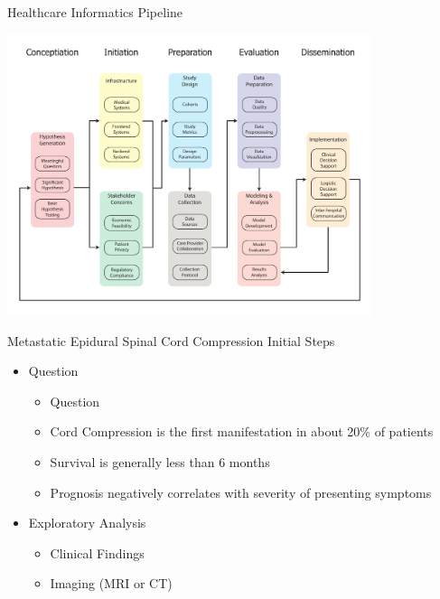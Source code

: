 \documentclass[10pt]{beamer}
\begin{document}




\begin{frame}{Healthcare Informatics Pipeline}
	\begin{center}
		\includegraphics[width=0.8\textwidth]{images/informatics_pipeline.pdf}	
	\end{center}
\end{frame}








\begin{frame}{Metastatic Epidural Spinal Cord Compression}
Initial Steps
	\begin{itemize} %
		\item Question
		\begin{itemize}
			\item Question
			\item Cord Compression is the first manifestation in about 20\% of patients
			\item Survival is generally less than 6 months
			\item Prognosis negatively correlates with severity of presenting symptoms
		\end{itemize}
		\item Exploratory Analysis
		\begin{itemize}
			\item Clinical Findings
			\item Imaging (MRI or CT)
		\end{itemize}
	\end{itemize}
\end{frame}
\end{document}
